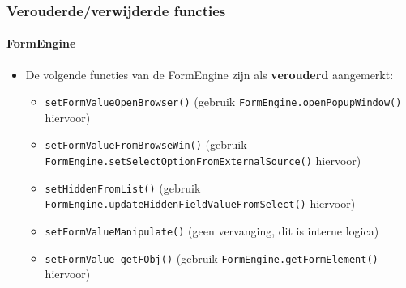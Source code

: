 
\begin{frame}[fragile]
	\frametitle{Verouderde/verwijderde functies}
	\framesubtitle{FormEngine}

	\lstset{basicstyle=\tiny\ttfamily}

	\begin{itemize}
		\item De volgende functies van de FormEngine zijn als \textbf{verouderd} aangemerkt:

			\begin{itemize}
				\item \texttt{setFormValueOpenBrowser()}\newline
					\smaller(gebruik \texttt{FormEngine.openPopupWindow()} hiervoor)\small

				\item \texttt{setFormValueFromBrowseWin()}\newline
					\smaller(gebruik \texttt{FormEngine.setSelectOptionFromExternalSource()} hiervoor)\small

				\item \texttt{setHiddenFromList()}\newline
					\smaller(gebruik \texttt{FormEngine.updateHiddenFieldValueFromSelect()} hiervoor)\small

				\item \texttt{setFormValueManipulate()}\newline
					\smaller(geen vervanging, dit is interne logica)\small

				\item \texttt{setFormValue\_getFObj()}\newline
					\smaller(gebruik \texttt{FormEngine.getFormElement()} hiervoor)\small

			\end{itemize}

	\end{itemize}

\end{frame}


